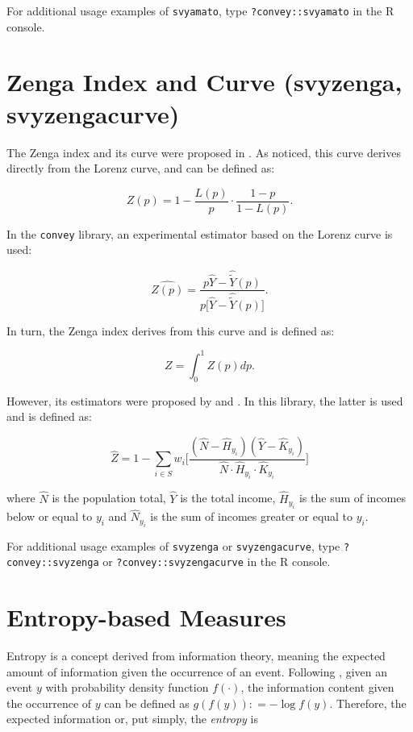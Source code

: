 \documentclass[]{book}
\theoremstyle{definition}
\theoremstyle{definition}
\theoremstyle{remark}
\begin{document}
For additional usage examples of \texttt{svyamato}, type
\texttt{?convey::svyamato} in the R console.

\section{Zenga Index and Curve (svyzenga,
svyzengacurve)}\label{zenga-index-and-curve-svyzenga-svyzengacurve}

The Zenga index and its curve were proposed in \citep{zenga2007}. As
\citep{polisicchio2011} noticed, this curve derives directly from the
Lorenz curve, and can be defined as:

\[
Z(p) = 1 - \frac{L(p)}{p} \cdot \frac{1 - p}{1 - L(p)}.
\]

In the \texttt{convey} library, an experimental estimator based on the
Lorenz curve is used:

\[
\widehat{Z(p)} = \frac{ p \widehat{Y} - \widehat{\widetilde{Y}}(p) }{p \big[ \widehat{Y} - \widehat{\widetilde{Y}}(p) \big] }.
\]

In turn, the Zenga index derives from this curve and is defined as:

\[
Z = \int_0^1 Z(p)dp.
\]

However, its estimators were proposed by \citep{langel2012} and
\citep{barabesi2016}. In this library, the latter is used and is defined
as:

\[
\widehat{Z} = 1 - \sum_{i \in S} w_i \bigg[ \frac{ ( \widehat{N} - \widehat{H}_{y_i} ) ( \widehat{Y} -\widehat{K}_{y_i} ) }
{ \widehat{N} \cdot \widehat{H}_{y_i} \cdot \widehat{K}_{y_i} } \bigg]
\]

where \(\widehat{N}\) is the population total, \(\widehat{Y}\) is the
total income, \(\widehat{H}_{y_i}\) is the sum of incomes below or equal
to \(y_i\) and \(\widehat{N}_{y_i}\) is the sum of incomes greater or
equal to \(y_i\).

For additional usage examples of \texttt{svyzenga} or
\texttt{svyzengacurve}, type \texttt{?convey::svyzenga} or
\texttt{?convey::svyzengacurve} in the R console.

\section{Entropy-based Measures}\label{entropy-based-measures}

Entropy is a concept derived from information theory, meaning the
expected amount of information given the occurrence of an event.
Following \citep{shannon1948}, given an event \(y\) with probability
density function \(f(\cdot)\), the information content given the
occurrence of \(y\) can be defined as \(g(f(y)) \colon= - \log f(y)\).
Therefore, the expected information or, put simply, the \emph{entropy}
is
\end{document}
